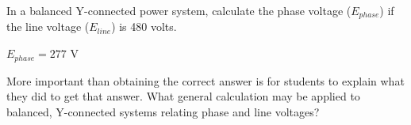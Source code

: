 

In a balanced Y-connected power system, calculate the phase voltage ($E_{phase}$) if the line voltage ($E_{line}$) is 480 volts.







$E_{phase} = 277$ V







More important than obtaining the correct answer is for students to explain what they did to get that answer.  What general calculation may be applied to balanced, Y-connected systems relating phase and line voltages?




